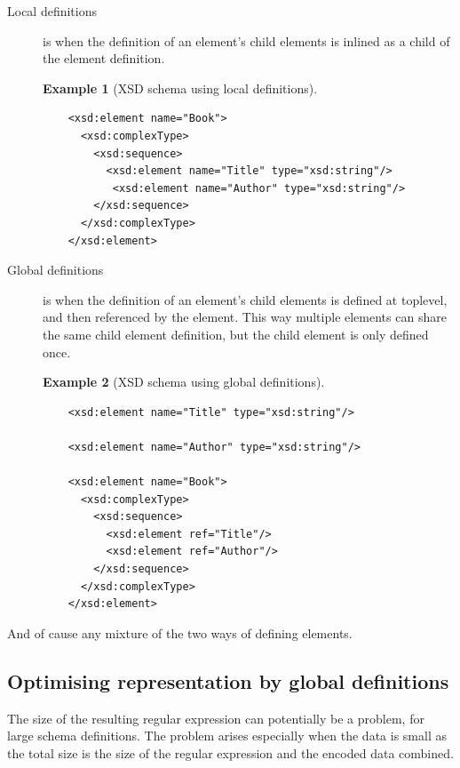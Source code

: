 \documentclass[a4paper, oneside]{memoir}
\theoremstyle{definition}
\newtheorem{example}{Example}
\begin{document}
\begin{description}
\item[Local definitions] is when the definition of an element's child elements is
  inlined as a child of the element definition. 

  \begin{example}[XSD schema using local definitions] \ %
\begin{verbatim}
    <xsd:element name="Book"> 
      <xsd:complexType> 
        <xsd:sequence> 
          <xsd:element name="Title" type="xsd:string"/> 
           <xsd:element name="Author" type="xsd:string"/> 
        </xsd:sequence> 
      </xsd:complexType> 
    </xsd:element>
\end{verbatim}
  \end{example}

\item[Global definitions] is when the definition of an element's child elements
  is defined at toplevel, and then referenced by the element. This way multiple
  elements can share the same child element definition, but the child element is
  only defined once.

  \begin{example}[XSD schema using global definitions] \ %
\begin{verbatim}
    <xsd:element name="Title" type="xsd:string"/>

    <xsd:element name="Author" type="xsd:string"/>

    <xsd:element name="Book">
      <xsd:complexType> 
        <xsd:sequence> 
          <xsd:element ref="Title"/> 
          <xsd:element ref="Author"/>
        </xsd:sequence> 
      </xsd:complexType> 
    </xsd:element>
\end{verbatim}
  \end{example}

\end{description}

And of cause any mixture of the two ways of defining elements.

\subsection{Optimising representation by global definitions}

The size of the resulting regular expression can potentially be a problem, for
large schema definitions. The problem arises especially when the data is small
as the total size is the size of the regular expression and the encoded data
combined.
\end{document}
